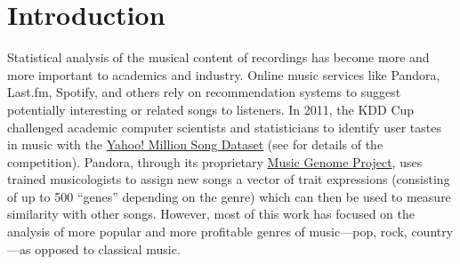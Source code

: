 \documentclass[aoas]{imsart}
\newcommand{\attn}[1]{\textcolor{red}{Note: #1}}
\begin{document}
\begin{frontmatter}
\begin{abstract}
\end{abstract}

\begin{keyword}
\end{keyword}





\end{frontmatter}



\section{Introduction}
\label{sec:introduction}


Statistical analysis of the musical content of recordings has
become more and more important to academics and industry. Online
music services like Pandora, Last.fm, Spotify, and others rely on
recommendation systems to suggest potentially interesting or related
songs to listeners. In 2011, the KDD Cup challenged academic computer
scientists and statisticians to identify user tastes in music with the
\href{http://labrosa.ee.columbia.edu/millionsong/}{Yahoo! Million
  Song Dataset} (see \citet{DrorKoenigstein2012} for details of the
competition). Pandora, through its proprietary
\href{https://www.pandora.com/about/mgp}{Music Genome Project}, uses
trained musicologists to assign new songs a vector of trait
expressions (consisting of up to 500 ``genes'' depending on the genre)
which can then be used to measure similarity with other
songs. However, most of this work has focused on the analysis of more popular
and more profitable genres of music---pop, rock, country---as opposed
to classical music. 
\end{document}

